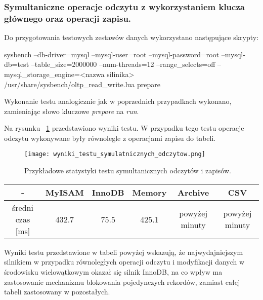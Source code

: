 \subsubsection{Symultaniczne operacje odczytu z wykorzystaniem klucza głównego oraz operacji zapisu.}

Do przygotowania testowych zestawów danych wykorzystano następujące skrypty:
\begin{spverbatim}
	sysbench --db-driver=mysql --mysql-user=root --mysql-password=root
	--mysql-db=test --table_size=2000000 --num-threads=12
	--range_selects=off --mysql_storage_engine=<nazwa silinika>
	/usr/share/sysbench/oltp_read_write.lua prepare
\end{spverbatim}

Wykonanie testu analogicznie jak w poprzednich przypadkach wykonano, zamieniając słowo kluczowe \textit{prepare} na \textit{run}.


Na rysunku ~\ref{fig:wyniki_testu_symulatnicznych_odczytow} przedstawiono wyniki testu. W przypadku tego testu operacje odczytu wykonywane były równolegle z operacjami zapisu do tabeli.
\begin{figure}[H]
	\centering
	\texttt{[image: wyniki\_testu\_symulatnicznych\_odczytow.png]}
	\caption{Przykładowe statystyki testu symultanicznych odczytów i zapisów.}
	\label{fig:wyniki_testu_symulatnicznych_odczytow}
\end{figure}
\begin{center}
	\begin{tabular}{ | c | c | c | c | c | c |}
		\hline
		- & MyISAM & InnoDB & Memory & Archive & CSV  \\ 
		\hline
		średni czas [ms] & 432.7 & 75.5 & 425.1 & powyżej minuty & powyżej minuty \\
		\hline
	\end{tabular}
\end{center}
Wyniki testu przedstawione w tabeli powyżej wskazują, że najwydajniejszym silnikiem w przypadku równoległych operacji odczytu i modyfikacji danych w środowisku wielowątkowym okazał się silnik InnoDB, na co wpływ ma zastosowanie mechanizmu blokowania pojedynczych rekordów, zamiast całej tabeli zastosowany w pozostałych.

